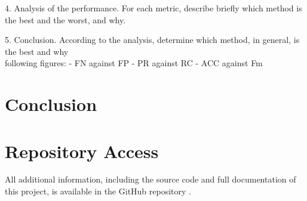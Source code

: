 \documentclass{article}
\begin{document}
4. Analysis of the performance. For each metric, describe briefly which 
method is the best and the worst, and why.


5. Conclusion. According to the analysis, determine which method, in general, is the best and why\\





following figures: 
- FN against FP
- PR against RC
- ACC against Fm 
\section{Conclusion}


\section{Repository Access}

All additional information, including the source code and full documentation of this project, is available in the GitHub repository \cite{cuevas2024github}.


\end{document}
